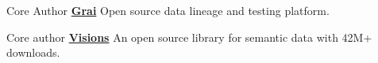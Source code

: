 \begin{cventries}
  \cventry
    {Core Author}   
    {\href{https://github.com/grai-io/grai-core}{\textbf{Grai}}}
    {}
    {}
    {Open source data lineage and testing platform.}


  \cventry
    {Core author}
    {\href{https://github.com/dylan-profiler/visions}{\textbf{Visions}}}
    {}
    {}
    {An open source library for semantic data with 42M+ downloads.}
\end{cventries}

